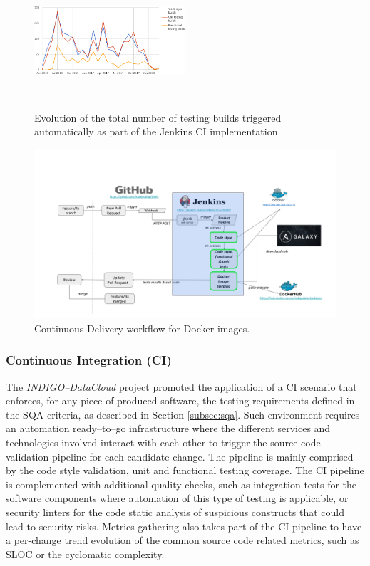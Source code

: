 \documentclass[journal]{IEEEtran}
\begin{document}
\begin{figure}[ht]
\centering
\includegraphics[width=0.5\textwidth, height=50mm]{images/jenkins_CI_builds.png}
\caption{Evolution of the total number of testing builds triggered automatically as part of the Jenkins CI implementation.}
\label{fig:fig_jenkins_CI_builds}
\end{figure}

\begin{figure}[ht]
\centering
\includegraphics[width=\textwidth]{images/devops.png}
\caption{Continuous Delivery workflow for Docker images.}
\label{fig:fig_CD}
\end{figure}


\subsubsection{Continuous Integration (CI)}
\label{subsec:ci}
The {\sl INDIGO--DataCloud} project promoted the application of a CI scenario that enforces,
for any piece of produced software, the testing requirements defined in the SQA criteria,
as described in Section \ref{subsec:sqa}. Such environment requires an automation
ready--to--go infrastructure where the different services and technologies involved interact with each
other to trigger the source code validation pipeline for each candidate change. The
pipeline is mainly comprised by the code style validation, unit and functional testing
coverage. The CI pipeline is complemented with additional quality checks, such as
integration tests for the software components where automation of this type of testing
is applicable, or security linters for the code static analysis of suspicious
constructs that could lead to security risks. Metrics gathering also takes part of
the CI pipeline to have a per-change trend evolution of the common source code
related metrics, such as SLOC or the cyclomatic complexity.
\end{document}
